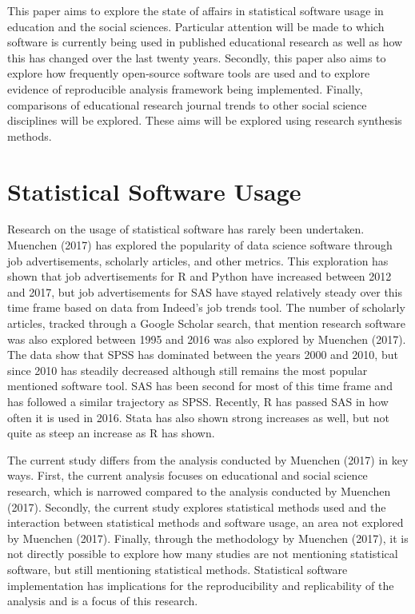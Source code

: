 \documentclass[
  english,
  ,man]{apa6}
\begin{document}
This paper aims to explore the state of affairs in statistical software usage in education and the social sciences. Particular attention will be made to which software is currently being used in published educational research as well as how this has changed over the last twenty years. Secondly, this paper also aims to explore how frequently open-source software tools are used and to explore evidence of reproducible analysis framework being implemented. Finally, comparisons of educational research journal trends to other social science disciplines will be explored. These aims will be explored using research synthesis methods.

\hypertarget{statistical-software-usage}{%
\section{Statistical Software Usage}\label{statistical-software-usage}}

Research on the usage of statistical software has rarely been undertaken. Muenchen (2017) has explored the popularity of data science software through job advertisements, scholarly articles, and other metrics. This exploration has shown that job advertisements for R and Python have increased between 2012 and 2017, but job advertisements for SAS have stayed relatively steady over this time frame based on data from Indeed's job trends tool. The number of scholarly articles, tracked through a Google Scholar search, that mention research software was also explored between 1995 and 2016 was also explored by Muenchen (2017). The data show that SPSS has dominated between the years 2000 and 2010, but since 2010 has steadily decreased although still remains the most popular mentioned software tool. SAS has been second for most of this time frame and has followed a similar trajectory as SPSS. Recently, R has passed SAS in how often it is used in 2016. Stata has also shown strong increases as well, but not quite as steep an increase as R has shown.

The current study differs from the analysis conducted by Muenchen (2017) in key ways. First, the current analysis focuses on educational and social science research, which is narrowed compared to the analysis conducted by Muenchen (2017). Secondly, the current study explores statistical methods used and the interaction between statistical methods and software usage, an area not explored by Muenchen (2017). Finally, through the methodology by Muenchen (2017), it is not directly possible to explore how many studies are not mentioning statistical software, but still mentioning statistical methods. Statistical software implementation has implications for the reproducibility and replicability of the analysis and is a focus of this research.
\end{document}
